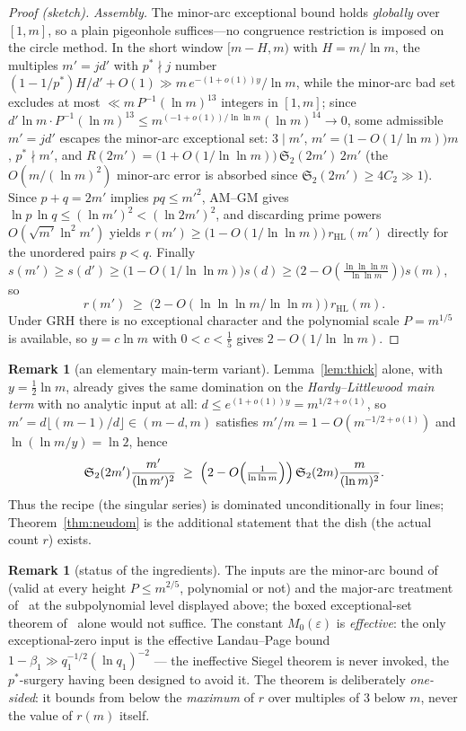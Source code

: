 \documentclass[11pt]{article}
\theoremstyle{plain}
\theoremstyle{definition}
\newtheorem{remark}[theorem]{Remark}
\newcommand{\rch}{r}
\begin{document}
\begin{proof}[Proof (sketch)]
\emph{Assembly.} The minor-arc exceptional bound holds \emph{globally}
over $[1, m]$, so a plain pigeonhole suffices---no congruence
restriction is imposed on the circle method. In the short window
$[m - H, m)$ with $H = m/\ln m$, the multiples $m' = j d'$ with
$p^{\ast} \nmid j$ number
$(1 - 1/p^{\ast}) H/d' + O(1) \gg m\,e^{-(1+o(1))y}/\ln m$,
while the minor-arc bad set excludes at most
$\ll m\,P^{-1}(\ln m)^{13}$ integers in $[1, m]$; since
$d'\ln m\cdot P^{-1}(\ln m)^{13} \le
m^{(-1 + o(1))/\ln\ln m}(\ln m)^{14} \to 0$, some admissible
$m' = j d'$ escapes the minor-arc exceptional set:
$3 \mid m'$, $m' = \bigl(1 - O(1/\ln m)\bigr)m$, $p^{\ast} \nmid m'$,
and
$R(2m') = \bigl(1 + O(1/\ln\ln m)\bigr)\,\mathfrak{S}_2(2m')\,2m'$
(the $O(m/(\ln m)^{2})$ minor-arc error is absorbed since
$\mathfrak{S}_2(2m') \ge 4C_2 \gg 1$). Since $p + q = 2m'$ implies
$pq \le m'^{2}$, AM--GM gives
$\ln p\,\ln q \le (\ln m')^{2} < (\ln 2m')^{2}$, and discarding
prime powers $O(\sqrt{m'}\ln^{2} m')$ yields
$\rch(m') \ge \bigl(1 - O(1/\ln\ln m)\bigr)\,r_{\mathrm{HL}}(m')$
directly for the unordered pairs $p < q$. Finally
$s(m') \ge s(d') \ge \bigl(1 - O(1/\ln\ln m)\bigr) s(d)
\ge \bigl(2 - O(\frac{\ln\ln\ln m}{\ln\ln m})\bigr)s(m)$, so
\[
\rch(m') \;\ge\; \bigl(2 - O(\ln\ln\ln m/\ln\ln m)\bigr)\,
r_{\mathrm{HL}}(m) .
\]
Under GRH there is no exceptional character and the polynomial
scale $P = m^{1/5}$ is available, so $y = c\ln m$ with
$0 < c < \tfrac15$ gives $2 - O(1/\ln\ln m)$.
\end{proof}

\begin{remark}[an elementary main-term variant]\label{rem:elementary}
Lemma~\ref{lem:thick} alone, with $y = \frac{1}{2}\ln m$, already
gives the same domination on the \emph{Hardy--Littlewood main
term} with no analytic input at all: $d \le e^{(1+o(1))y}
= m^{1/2 + o(1)}$, so $m' = d\lfloor(m-1)/d\rfloor \in (m - d, m)$
satisfies $m'/m = 1 - O(m^{-1/2 + o(1)})$ and
$\ln(\ln m/y) = \ln 2$, hence
\[
\mathfrak{S}_2(2m')\frac{m'}{(\ln m')^{2}}
\;\ge\;
\Bigl(2 - O\Bigl(\tfrac{1}{\ln\ln m}\Bigr)\Bigr)\,
\mathfrak{S}_2(2m)\frac{m}{(\ln m)^{2}} .
\]
Thus the recipe (the singular series) is dominated unconditionally
in four lines; Theorem~\ref{thm:neudom} is the additional statement
that the dish (the actual count $\rch$) exists.
\end{remark}


\begin{remark}[status of the ingredients]\label{rem:mvstatus}
The inputs are the minor-arc bound of
\cite[Theorem~3.1]{vaughan} (valid at every height
$P \le m^{2/5}$, polynomial or not) and the major-arc treatment
of~\cite{mv} at the subpolynomial level displayed above; the
boxed exceptional-set theorem of~\cite{mv} alone would not
suffice. The constant $M_0(\varepsilon)$ is \emph{effective}:
the only exceptional-zero input is the effective
Landau--Page bound $1 - \beta_1 \gg q_1^{-1/2}(\ln q_1)^{-2}$
--- the ineffective Siegel theorem is never invoked, the
$p^{\ast}$-surgery having been designed to avoid it. The theorem is deliberately \emph{one-sided}: it bounds
from below the \emph{maximum} of $\rch$ over multiples of $3$
below $m$, never the value of $\rch(m)$ itself.
\end{remark}
\end{document}
